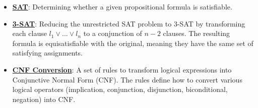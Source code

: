 \documentclass{article}%
\begin{document}
\begin{itemize}[leftmargin=*]%
\item \href{https://purdue.brightspace.com/d2l/common/assets/pdfjs-d2l-dist/1.0.14-legacy/web/viewer.html?file=\%2Fcontent\%2Fenforced\%2F1095467-wl.202510.CS.24300.001\%2F13L1-Logic.pdf\%3Fou\%3D1095467\&lang=en-us\&container=d2l-fileviewer-rendered-pdf\&fullscreen=d2l-fileviewer-rendered-pdf-dialog\&height=667#page=15}{\textbf{SAT}}: Determining whether a given propositional formula is satisfiable.%
\item \href{https://purdue.brightspace.com/d2l/common/assets/pdfjs-d2l-dist/1.0.14-legacy/web/viewer.html?file=\%2Fcontent\%2Fenforced\%2F1095467-wl.202510.CS.24300.001\%2F13L1-Logic.pdf\%3Fou\%3D1095467\&lang=en-us\&container=d2l-fileviewer-rendered-pdf\&fullscreen=d2l-fileviewer-rendered-pdf-dialog\&height=667#page=24}{\textbf{3{-}SAT}}: Reducing the unrestricted SAT problem to 3-SAT by transforming each clause $l_1 \lor ... \lor l_n$ to a conjunction of $n-2$ clauses. The resulting formula is equisatisfiable with the original, meaning they have the same set of satisfying assignments.%
\item \href{https://purdue.brightspace.com/d2l/common/assets/pdfjs-d2l-dist/1.0.14-legacy/web/viewer.html?file=\%2Fcontent\%2Fenforced\%2F1095467-wl.202510.CS.24300.001\%2F13L1-Logic.pdf\%3Fou\%3D1095467\&lang=en-us\&container=d2l-fileviewer-rendered-pdf\&fullscreen=d2l-fileviewer-rendered-pdf-dialog\&height=667#page=17}{\textbf{CNF Conversion}}: A set of rules to transform logical expressions into Conjunctive Normal Form (CNF). The rules define how to convert various logical operators (implication, conjunction, disjunction, biconditional, negation) into CNF.%
\end{itemize}%
\end{document}
